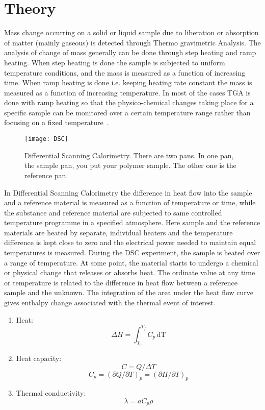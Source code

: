 \documentclass[11pt, a4paper]{article}
\begin{document}
\section{Theory}
Mass change occurring on a solid or liquid sample due to liberation or absorption of matter (mainly gaseous) is detected through Thermo gravimetric Analysis. The analysis of change of mass generally can be done through step heating and ramp heating. When step heating is done the sample is subjected to uniform temperature conditions, and the mass is measured as a function of increasing time. When ramp heating is done i.e. keeping heating rate constant the mass is measured as a function of increasing temperature. In most of the cases TGA is done with ramp heating so that the physico-chemical changes taking place for a specific sample can be monitored over a certain temperature range rather than focusing on a fixed temperature~\citep{wilburn1989introduction,price2000thermogravimetry}.

\begin{figure}
	\centering
	\texttt{[image: DSC]}
	\caption{Differential Scanning Calorimetry. There are two pans. In one pan, the sample pan, you put your polymer sample. The other one is the reference pan.}
	\label{fig:dsc}
\end{figure}

In Differential Scanning Calorimetry the difference in heat flow into the sample and a
reference material is measured as a function of temperature or time, while the substance and reference material are subjected to same controlled temperature programme in a specified atmosphere. Here sample and the reference materials are heated by separate, individual heaters and the temperature difference is kept close to zero and the electrical power needed to maintain equal temperatures is measured. During the DSC experiment, the sample is heated over a range of temperature. At some point, the material starts to undergo a chemical or physical change that releases or absorbs heat. The ordinate value at any time or temperature is related to the difference in heat flow between a reference sample and the unknown. The integration of the area under the heat flow curve gives enthalpy change associated with the
thermal event of interest. 

\begin{enumerate}
	\item Heat:
	$$\Delta H = \int_{T_0}^{T_f}C_p\,\mathrm{dT}$$
	\item Heat capacity:
	$$C = Q/\Delta T$$
	$$C_p = (\partial Q/\partial T)_p = (\partial H/\partial T)_p $$	
	\item Thermal conductivity:
	$$\lambda = aC_p\rho$$
\end{enumerate}
\end{document}
